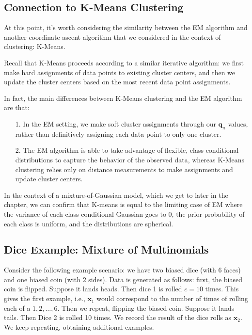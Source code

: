 \subsection{Connection to K-Means Clustering}

At this point, it's worth considering the similarity between the EM algorithm and another coordinate ascent algorithm that we considered in the context of clustering: K-Means.

Recall that K-Means proceeds according to a similar iterative algorithm: we first make hard assignments of data points to existing cluster centers, and then we update the cluster centers based on the most recent data point assignments.

In fact, the main differences between K-Means clustering and the EM algorithm are that:
\begin{itemize}
    \item[1.] In the EM setting, we make soft cluster assignments through our $\textbf{q}_n$ values, rather than definitively assigning each data point to only one cluster.
    \item[2.] The EM algorithm is able to take advantage of flexible, class-conditional distributions 
      to capture the behavior of the observed data, whereas K-Means clustering relies only on distance measurements to make assignments and update cluster centers.
    \end{itemize}

    In the context of a mixture-of-Gaussian model, which we get to later in the chapter, we can confirm that K-means is equal to the limiting case of EM where the variance of each class-conditional Gaussian goes to 0, the prior probability of each class is uniform, and the distributions are spherical.

    \subsection{Dice Example: Mixture of Multinomials}
    
    Consider the following example scenario: we have two biased dice (with 6 faces) and one biased coin (with 2 sides). Data is generated as follows: first, the biased coin is flipped. Suppose it lands heads. Then dice 1 is rolled $c=10$ times. This gives the first example, i.e., $\mathbf{x}_1$ would correspond to the number of times of rolling each of a $1, 2, \ldots, 6$. Then we repeat, flipping the biased coin. Suppose it lands tails. Then Dice 2 is rolled 10 times. We record the result of the dice rolls as $\mathbf{x}_2$. We keep repeating, obtaining additional examples. 

